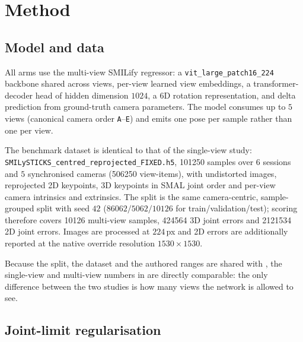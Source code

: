 \documentclass[11pt,a4paper]{article}
\begin{document}
\section{Method}
\label{sec:method}

\subsection{Model and data}

All arms use the multi-view SMILify regressor: a
\texttt{vit\_large\_\allowbreak patch16\_224} backbone shared across views, per-view
learned view embeddings, a transformer-decoder head of hidden dimension
$1024$, a 6D rotation representation, and delta prediction from
ground-truth camera parameters. The model consumes up to $5$ views
(canonical camera order \texttt{A}--\texttt{E}) and emits one pose per
sample rather than one per view.

The benchmark dataset is identical to that of the single-view study:
\texttt{SMILySTICKS\_\allowbreak centred\_\allowbreak reprojected\_\allowbreak FIXED.h5}, \num{101250} samples over
$6$ sessions and $5$ synchronised cameras (\num{506250} view-items), with
undistorted images, reprojected 2D keypoints, 3D keypoints in SMAL joint order
and per-view camera intrinsics and extrinsics. The split is the same
camera-centric, sample-grouped split with seed $42$
($\num{86062}/\num{5062}/\num{10126}$ for train/validation/test); scoring
therefore covers \num{10126} multi-view samples, \num{424564} 3D joint errors
and \num{2121534} 2D joint errors. Images are processed at $224\,$px and 2D
errors are additionally reported at the native override resolution
$1530\times1530$.

Because the split, the dataset and the authored ranges are shared with
\cite{sv}, the single-view and multi-view numbers in  are
directly comparable: the only difference between the two studies is how many
views the network is allowed to see.

\subsection{Joint-limit regularisation}
\end{document}
